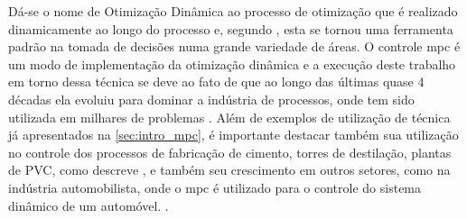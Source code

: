 Dá-se o nome de Otimização Dinâmica ao processo de otimização que é realizado
dinamicamente ao longo do processo e, segundo , esta se
tornou uma ferramenta padrão na tomada de decisões numa grande variedade de áreas.
O controle \acrshort{mpc} é um modo de implementação da otimização dinâmica e a execução
deste trabalho em torno dessa técnica se deve ao fato de que ao longo das últimas quase 4
décadas \cite{Lee2011} ela evoluiu para dominar a indústria de processos, onde tem sido
utilizada em milhares de problemas \cite{Borrelli2017}.
Além de exemplos de utilização de técnica já apresentados na \cref{sec:intro_mpc}, é
importante destacar também sua utilização no controle dos processos de fabricação de cimento,
torres de destilação, plantas de PVC, como descreve , e também 
seu crescimento em outros setores, como na indústria automobilista, onde o \acrshort{mpc}
é utilizado para o controle do sistema dinâmico de um automóvel. \cite{Yakub2013}.




